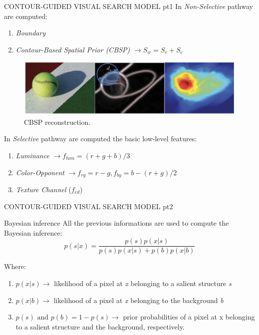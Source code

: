 \documentclass[10pt]{beamer}
\begin{document}
\begin{frame}[t]{CONTOUR-GUIDED VISUAL SEARCH MODEL pt1}
    In \emph{Non-Selective} pathway are computed:
    \begin{enumerate}
        \item \emph{Boundary} 
        \item \emph{Contour-Based Spatial Prior (CBSP)} $ \rightarrow S_w = S_e + S_c $
    \end{enumerate}
    \begin{figure}[htbp]
        \centering
        \includegraphics[width = 0.5\linewidth]{images/paper1/CBSP.png}
        \centering
        \caption{CBSP reconstruction.}\vspace{0mm}
        \label{fid: CBSP}
    \end{figure}
    In \emph{Selective} pathway are computed the basic low-level features:
    \begin{enumerate}
        \item \emph{Luminance} $ \rightarrow f_{lum} = (r+g+b)/3 $
        \item \emph{Color-Opponent} $ \rightarrow f_{rg} = r-g , f_{by} = b-(r+g)/2 $
        \item \emph{Texture Channel} ($ f_{ed} $)
    \end{enumerate}
\end{frame}

\begin{frame}[t]{CONTOUR-GUIDED VISUAL SEARCH MODEL pt2}
    \begin{block}{Bayesian inference}
        All the previous informations are used to compute the Bayesian inference:
        $$ p(s|x) = \frac{p(s)p(x|s)}{p(s)p(x|s)+p(b)p(x|b) } $$
    \end{block}
    Where:
    \begin{enumerate}
        \item $ p(x|s) \rightarrow $ likelihood of a pixel at \emph{x} belonging to a salient structure \emph{s}
        \item $ p(x|b) \rightarrow $ likelihood of a pixel at \emph{x} belonging to the background \emph{b}
        \item $ p(s) \mbox{ and } p(b)=1-p(s) \rightarrow $ prior probabilities of a pixel at x belonging to a salient structure and the background, respectively.
    \end{enumerate}
\end{frame}





    
\end{document}

